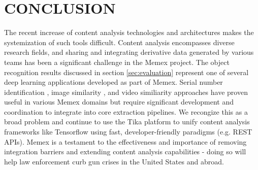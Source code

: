 \section{CONCLUSION} \label{sec:future}
The recent increase of content analysis technologies and architectures makes the systemization of such tools difficult. Content analysis encompasses diverse research fields, and sharing and integrating derivative data generated by various teams has been a significant challenge in the Memex project. The object recognition results discussed in section \ref{sec:evaluation} represent one of several deep learning applications developed as part of Memex. Serial number identification \cite{parekh2016tesseract}, image similarity \cite{zhou2016multimedia}, and video similiarity \cite{mattmann2016scalable} approaches have proven useful in various Memex domains but require significant development and coordination to integrate into core extraction pipelines. We recongize this as a broad problem and continue to use the Tika platform to unify content analysis frameworks like Tensorflow using fast, developer-friendly paradigms (e.g. REST APIs). Memex is a testament to the effectiveness and importance of removing integration barriers and extending content analysis capabilities - doing so will help law enforcement curb gun crises in the United States and abroad. 
